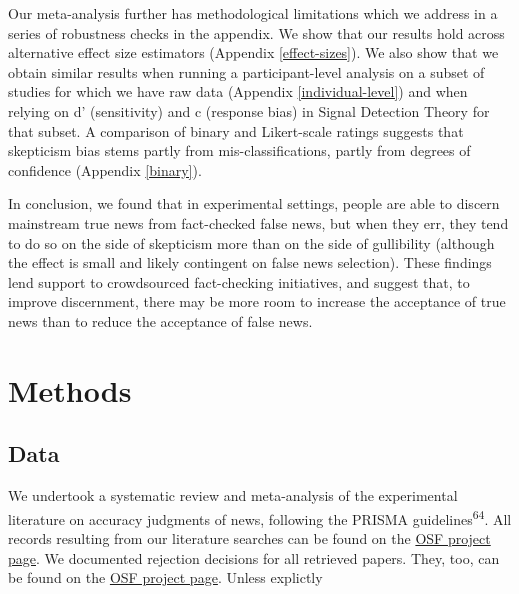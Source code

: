 \documentclass[
  man]{apa6}
\begin{document}
Our meta-analysis further has methodological limitations which we address in a series of robustness checks in the appendix. We show that our results hold across alternative effect size estimators (Appendix \ref{effect-sizes}). We also show that we obtain similar results when running a participant-level analysis on a subset of studies for which we have raw data (Appendix \ref{individual-level}) and when relying on d' (sensitivity) and c (response bias) in Signal Detection Theory for that subset. A comparison of binary and Likert-scale ratings suggests that skepticism bias stems partly from mis-classifications, partly from degrees of confidence (Appendix \ref{binary}).

In conclusion, we found that in experimental settings, people are able to discern mainstream true news from fact-checked false news, but when they err, they tend to do so on the side of skepticism more than on the side of gullibility (although the effect is small and likely contingent on false news selection). These findings lend support to crowdsourced fact-checking initiatives, and suggest that, to improve discernment, there may be more room to increase the acceptance of true news than to reduce the acceptance of false news.

\section{Methods}\label{methods}

\subsection{Data}\label{data}

We undertook a systematic review and meta-analysis of the experimental literature on accuracy judgments of news, following the PRISMA guidelines\textsuperscript{64}. All records resulting from our literature searches can be found on the \href{https://osf.io/96zbp/?view_only=d2f3147f652e44e2a0414d7d6d9a6c29}{OSF project page}. We documented rejection decisions for all retrieved papers. They, too, can be found on the \href{https://osf.io/96zbp/?view_only=d2f3147f652e44e2a0414d7d6d9a6c29}{OSF project page}. Unless explictly
\end{document}

